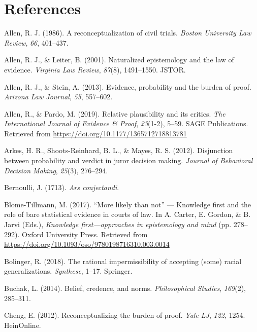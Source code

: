 \documentclass[10pt,dvipsnames,enabledeprecatedfontcommands]{scrartcl}
\begin{document}
\section*{References}\label{references}

\hypertarget{refs}{}
\hypertarget{ref-Allen1986A-Reconceptuali}{}
Allen, R. J. (1986). A reconceptualization of civil trials. \emph{Boston
University Law Review}, \emph{66}, 401--437.

\hypertarget{ref-allen2001naturalized}{}
Allen, R. J., \& Leiter, B. (2001). Naturalized epistemology and the law
of evidence. \emph{Virginia Law Review}, \emph{87}(8), 1491--1550.
JSTOR.

\hypertarget{ref-allen2013}{}
Allen, R. J., \& Stein, A. (2013). Evidence, probability and the burden
of proof. \emph{Arizona Law Journal}, \emph{55}, 557--602.

\hypertarget{ref-AllenPardo2019relative}{}
Allen, R., \& Pardo, M. (2019). Relative plausibility and its critics.
\emph{The International Journal of Evidence \& Proof}, \emph{23}(1-2),
5--59. SAGE Publications. Retrieved from
\url{https://doi.org/10.1177/1365712718813781}

\hypertarget{ref-arkesEtAl2012}{}
Arkes, H. R., Shoots-Reinhard, B. L., \& Mayes, R. S. (2012).
Disjunction between probability and verdict in juror decision making.
\emph{Journal of Behavioral Decision Making}, \emph{25}(3), 276--294.

\hypertarget{ref-Bernoulli1713Ars-conjectandi}{}
Bernoulli, J. (1713). \emph{Ars conjectandi}.

\hypertarget{ref-BlomeTillmann2017}{}
Blome-Tillmann, M. (2017). ``More likely than not'' --- Knowledge first
and the role of bare statistical evidence in courts of law. In A.
Carter, E. Gordon, \& B. Jarvi (Eds.), \emph{Knowledge
first---approaches in epistemology and mind} (pp. 278--292). Oxford
University Press. Retrieved from
\url{https://doi.org/10.1093/oso/9780198716310.003.0014}

\hypertarget{ref-bolinger2018rational}{}
Bolinger, R. (2018). The rational impermissibility of accepting (some)
racial generalizations. \emph{Synthese}, 1--17. Springer.

\hypertarget{ref-buchak2014belief}{}
Buchak, L. (2014). Belief, credence, and norms. \emph{Philosophical
Studies}, \emph{169}(2), 285--311.

\hypertarget{ref-cheng2012reconceptualizing}{}
Cheng, E. (2012). Reconceptualizing the burden of proof. \emph{Yale LJ},
\emph{122}, 1254. HeinOnline.
\end{document}
